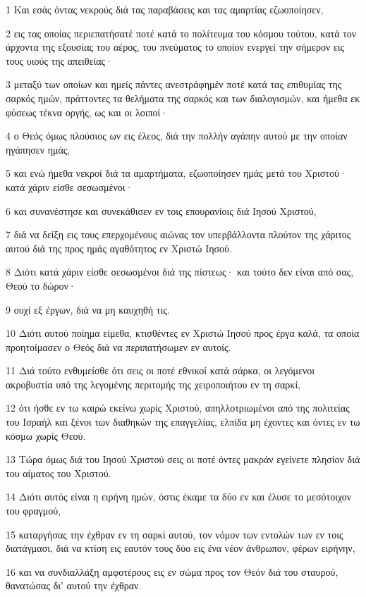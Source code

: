 \par 1 Και εσάς όντας νεκρούς διά τας παραβάσεις και τας αμαρτίας εζωοποίησεν,
\par 2 εις τας οποίας περιεπατήσατέ ποτέ κατά το πολίτευμα του κόσμου τούτου, κατά τον άρχοντα της εξουσίας του αέρος, του πνεύματος το οποίον ενεργεί την σήμερον εις τους υιούς της απειθείας·
\par 3 μεταξύ των οποίων και ημείς πάντες ανεστράφημέν ποτέ κατά τας επιθυμίας της σαρκός ημών, πράττοντες τα θελήματα της σαρκός και των διαλογισμών, και ήμεθα εκ φύσεως τέκνα οργής, ως και οι λοιποί·
\par 4 ο Θεός όμως πλούσιος ων εις έλεος, διά την πολλήν αγάπην αυτού με την οποίαν ηγάπησεν ημάς,
\par 5 και ενώ ήμεθα νεκροί διά τα αμαρτήματα, εζωοποίησεν ημάς μετά του Χριστού· κατά χάριν είσθε σεσωσμένοι·
\par 6 και συνανέστησε και συνεκάθισεν εν τοις επουρανίοις διά Ιησού Χριστού,
\par 7 διά να δείξη εις τους επερχομένους αιώνας τον υπερβάλλοντα πλούτον της χάριτος αυτού διά της προς ημάς αγαθότητος εν Χριστώ Ιησού.
\par 8 Διότι κατά χάριν είσθε σεσωσμένοι διά της πίστεως· και τούτο δεν είναι από σας, Θεού το δώρον·
\par 9 ουχί εξ έργων, διά να μη καυχηθή τις.
\par 10 Διότι αυτού ποίημα είμεθα, κτισθέντες εν Χριστώ Ιησού προς έργα καλά, τα οποία προητοίμασεν ο Θεός διά να περιπατήσωμεν εν αυτοίς.
\par 11 Διά τούτο ενθυμείσθε ότι σεις οι ποτέ εθνικοί κατά σάρκα, οι λεγόμενοι ακροβυστία υπό της λεγομένης περιτομής της χειροποιήτου εν τη σαρκί,
\par 12 ότι ήσθε εν τω καιρώ εκείνω χωρίς Χριστού, απηλλοτριωμένοι από της πολιτείας του Ισραήλ και ξένοι των διαθηκών της επαγγελίας, ελπίδα μη έχοντες και όντες εν τω κόσμω χωρίς Θεού.
\par 13 Τώρα όμως διά του Ιησού Χριστού σεις οι ποτέ όντες μακράν εγείνετε πλησίον διά του αίματος του Χριστού.
\par 14 Διότι αυτός είναι η ειρήνη ημών, όστις έκαμε τα δύο εν και έλυσε το μεσότοιχον του φραγμού,
\par 15 καταργήσας την έχθραν εν τη σαρκί αυτού, τον νόμον των εντολών των εν τοις διατάγμασι, διά να κτίση εις εαυτόν τους δύο εις ένα νέον άνθρωπον, φέρων ειρήνην,
\par 16 και να συνδιαλλάξη αμφοτέρους εις εν σώμα προς τον Θεόν διά του σταυρού, θανατώσας δι' αυτού την έχθραν.
